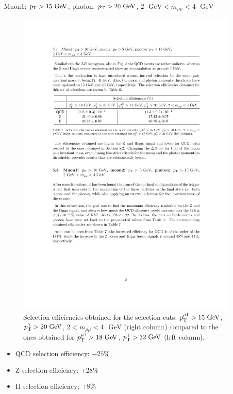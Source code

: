 \documentclass[aspectratio = 1610, xcolor = dvipsnames]{beamer}
\newcommand{\GeV}{\textrm{ }\mathrm{GeV}}
\newcommand{\pt}{p_{\rm T}}
\newcommand{\red}{\textcolor{unipd}}
\begin{document}
    \begin{frame}[t]{Muon1: $\pt > 15\GeV$, photon: $\pt>20\GeV$, $2\GeV<m_{\mu\mu}<4\GeV$}

        \begin{figure}[c]
            \centering
            \includegraphics[width=1\textwidth]{images/Mu15_Ph20_2mumuM4_table.pdf}
            \caption{Selection efficiencies obtained for the selection cuts: $\pt^{\mu 1} > 15\GeV$, $\pt^{\gamma} > 20\GeV$, $2 <m_{\mu\mu} <4\GeV$ (right column) compared to the ones obtained for $\pt^{\mu 1} > 18\GeV$, $\pt^{\gamma} > 32\GeV$ (left column).
            \label{im:Mu15_Ph20_2mumuM4_table}}
        \end{figure}
        
        \begin{itemize}
            \item QCD selection efficiency: \red{$ - 25\%$}
            \item Z selection efficiency: \red{$ + 28\%$}
            \item H selection efficiency: \red{$ + 8\%$}
        \end{itemize}

    \end{frame}
\end{document}
